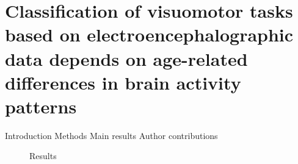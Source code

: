 \section{Classification of visuomotor tasks based on electroencephalographic data depends on age-related differences in brain activity patterns}


Introduction 
Methods 
Main results
Author contributions

\begin{figure}[h]
\begin{center}

\caption[Reuslts]{Results}
\label{fig:DSI_exp1}
\end{center}
\end{figure}